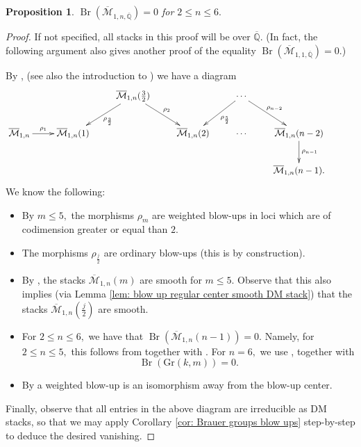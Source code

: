 \documentclass{amsart}
\newtheorem{prop}{Proposition}[section]
\theoremstyle{definition}
\theoremstyle{remark}
\DeclareMathOperator{\Br}{Br}
\newcommand{\Q}{\mathbb{Q}}
\begin{document}
\begin{prop}\label{Prop: vanishing g 1 n 2 3 4 5 6}
    $\Br(\overline{\mathcal{M}}_{1,n,\overline{\Q}})=0$
    for $2\leq n \leq 6.$
\end{prop}
\begin{proof}
    If not specified, all stacks in this proof will be over $\overline{\Q}.$
    (In fact, the following argument also gives another proof of the equality $\Br(\overline{\mathcal{M}}_{1,1,\overline{\Q}})=0$.)
    
    By \cite{RSPW19GenusOneLogarithmic}, \cite{Smyth19DiagramG1} (see also the introduction to \cite{battistella2024wallcrossingintegralchowrings}) we have a 
    diagram
    $$
        \xymatrix{
        &    &  \ar[ld]^-{\rho_{\frac{3}{2}}} \overline{\mathcal{M}}_{1,n}(\frac{3}{2}) \ar[rd]^-{\rho_{2}} & & \ar[ld]^-{\rho_{\frac{5}{2}}} \cdots \ar[rd]^-{\rho_{n-2}} & \\     
        \overline{\mathcal{M}}_{1,n} \ar[r]^-{\rho_{1}}   & \overline{\mathcal{M}}_{1,n}(1) &  & \overline{\mathcal{M}}_{1,n}(2) & \cdots & \overline{\mathcal{M}}_{1,n}(n-2) \ar[d]^-{\rho_{n-1}} & \\
        & & & & & \overline{\mathcal{M}}_{1,n}(n-1).
        }
    $$
    We know the following:
    \begin{itemize}
        \item By \cite[Theorem 1.12]{battistella2024wallcrossingintegralchowrings} $m\leq 5,$ the morphisms $\rho_{m}$ are weighted blow-ups in loci which are of codimension greater or equal than $2.$
        \item The morphisms $\rho_{\frac{j}{2}}$ are ordinary blow-ups (this is by construction).
        \item By \cite[Theorem 1.5]{battistella2024wallcrossingintegralchowrings}, the stacks $\overline{\mathcal{M}}_{1,n}(m)$ are smooth for $m\leq 5.$ Observe that this also implies (via Lemma \ref{lem: blow up regular center smooth DM stack}) that the stacks $\overline{\mathcal{M}}_{1,n}(\frac{j}{2})$ are smooth.
        \item For $2\leq n \leq 6,$ we have that $\Br(\overline{\mathcal{M}}_{1,n}(n-1))=0.$
        Namely, for $2\leq n \leq 5,$ this follows from \cite[Proposition 1.8]{battistella2024wallcrossingintegralchowrings} together with \cite[Theorem 1.2]{ShinBrauerWeighted}. 
        For $n=6,$ we use \cite[Corollary 1.5.5, Proposition 1.7.1]{LP19ModularCompactification}, together with
        $$
            \Br(\text{Gr}(k,m))=0.
        $$
        \item By \cite[Remark 3.2.10]{WeightedBlowUps} a weighted blow-up is an isomorphism away from the blow-up center.
    \end{itemize}
    Finally, observe that all entries in the above diagram are irreducible as DM stacks, so that we may apply Corollary \ref{cor: Brauer groups blow ups} step-by-step to deduce the desired vanishing.
\end{proof}
\end{document}
